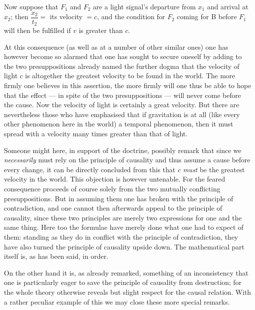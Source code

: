 \documentclass[12pt,a4paper]{article}
\begin{document}
Now suppose that $F_{1}$ and $F_{2}$ are a light signal's departure from
$x_{1}$ and arrival at $x_{2}$; then $\dfrac{x_{2}}{t_{2}} =$ its velocity
$= c$, and the condition for $F_{2}$ coming for B before $F_{1}$ will then be
fulfilled if $v$ is greater than $c$.

At this consequence (as well as at a number of other similar ones) one has
however become so alarmed that one has sought to secure oneself by adding to
the two presuppositions already named the further dogma that the velocity of
light $c$ is altogether the greatest velocity to be found in the world. The
more firmly one believes in this assertion, the more firmly will one thus be
able to hope that the effect --- in spite of the two presuppositions --- will
never come before the cause. Now the velocity of light is certainly a great
velocity. But there are nevertheless those who have emphasised that if
gravitation is at all (like every other phenomenon here in the world) a
temporal phenomenon, then it must spread with a velocity many times greater
than that of light.

Someone might here, in support of the doctrine, possibly remark that since we
\emph{necessarily} must rely on the principle of causality and thus assume a
cause before every change, it can be directly concluded from this that $c$
\emph{must} be the greatest velocity in the world. This objection is however
untenable. For the feared consequence proceeds of course solely from the two
mutually conflicting presuppositions. But in assuming them one has broken with
the principle of contradiction, and one cannot then afterwards appeal to the
principle of causality, since these two principles are merely two expressions
for one and the same thing. Here too the formulae have merely done what one
had to expect of them: standing as they do in conflict with the principle of
contradiction, they have also turned the principle of causality upside down.
The mathematical part itself is, as has been said, in order.

On the other hand it is, as already remarked, something of an inconsistency
that one is particularly eager to save the principle of causality from
destruction; for the whole theory otherwise reveals but slight respect for the
causal relation. With a rather peculiar example of this we may close these
more special remarks.
\end{document}

